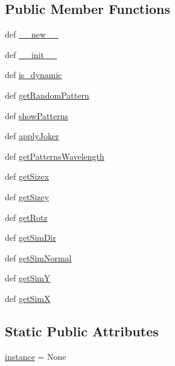 \subsection*{Public Member Functions}
\begin{DoxyCompactItemize}
\item 
def \hyperlink{classdestruction_1_1_data_1_1_set_pattern_aed9446173457361ac123f46b61fbafb2}{\-\_\-\-\_\-new\-\_\-\-\_\-}
\item 
def \hyperlink{classdestruction_1_1_data_1_1_set_pattern_a7dada2889c2aa0916c7d0cb5593697e2}{\-\_\-\-\_\-init\-\_\-\-\_\-}
\item 
def \hyperlink{classdestruction_1_1_data_1_1_set_pattern_af0144eb4d96f18f4e8b880b12c3d7bc1}{is\-\_\-dynamic}
\item 
def \hyperlink{classdestruction_1_1_data_1_1_set_pattern_aed3ec81904ff99991adbbf957562f383}{get\-Random\-Pattern}
\item 
def \hyperlink{classdestruction_1_1_data_1_1_set_pattern_a686f6691cb2b51fd142ec8cb5df7ad78}{show\-Patterns}
\item 
def \hyperlink{classdestruction_1_1_data_1_1_set_pattern_a6ef6164095eea5b358b28f1c5eb1ef9f}{apply\-Joker}
\item 
def \hyperlink{classdestruction_1_1_data_1_1_set_pattern_a802e15b0d624b49db60fd3ec587440d7}{get\-Patterns\-Wavelength}
\item 
def \hyperlink{classdestruction_1_1_data_1_1_set_pattern_a2ee495e2b3d970d9a7cb38d5a733a408}{get\-Sizex}
\item 
def \hyperlink{classdestruction_1_1_data_1_1_set_pattern_a1af195b3945ef10394ce87a18a19bb6b}{get\-Sizey}
\item 
def \hyperlink{classdestruction_1_1_data_1_1_set_pattern_a3b1fb65052258c5cc6335bae5df2eb19}{get\-Rotz}
\item 
def \hyperlink{classdestruction_1_1_data_1_1_set_pattern_a27f206d21d01d9b275a5c563d7081932}{get\-Sim\-Dir}
\item 
def \hyperlink{classdestruction_1_1_data_1_1_set_pattern_a25ae0ff4d4681e0c0ffb95c62971a309}{get\-Sim\-Normal}
\item 
def \hyperlink{classdestruction_1_1_data_1_1_set_pattern_a9982042b217b786c278032c0ada35866}{get\-Sim\-Y}
\item 
def \hyperlink{classdestruction_1_1_data_1_1_set_pattern_ab118a69fefb7249a790cb98c1dd1a3a1}{get\-Sim\-X}
\end{DoxyCompactItemize}
\subsection*{Static Public Attributes}
\begin{DoxyCompactItemize}
\item 
\hyperlink{classdestruction_1_1_data_1_1_set_pattern_a6f4737bb988985367e6dc2ccc263f7ea}{instance} = None
\end{DoxyCompactItemize}



